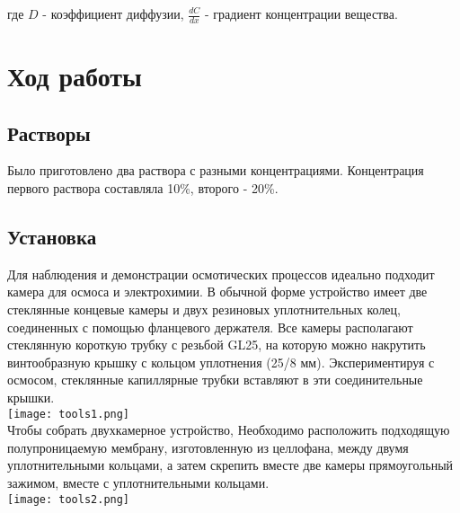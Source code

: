 \documentclass{article}
\begin{document}
            где $D$ - коэффициент диффузии, $\frac{dC}{dx}$ - градиент концентрации
            вещества. \\

    \newpage
    \section*{Ход работы}

        \subsection*{Растворы}
            \hspace*{4mm}Было приготовлено два раствора  с разными концентрациями.
            Концентрация первого раствора составляла 10\%, второго - 20\%.


        \subsection*{Установка}
            \hspace*{4mm}Для наблюдения и демонстрации осмотических процессов идеально
            подходит камера для осмоса и электрохимии. В обычной форме
            устройство имеет две стеклянные концевые камеры и двух резиновых
            уплотнительных колец, соединенных с помощью фланцевого держателя. Все
            камеры располагают стеклянную короткую трубку с резьбой GL25, на которую
            можно накрутить винтообразную крышку с кольцом уплотнения (25/8 мм).
            Экспериментируя с осмосом, стеклянные капиллярные трубки вставляют в эти
            соединительные крышки. \\
        
            \texttt{[image: tools1.png]} \\

            \hspace*{4mm}Чтобы собрать двухкамерное устройство,
            Необходимо расположить подходящую полупроницаемую мембрану,
            изготовленную из целлофана, между двумя уплотнительными кольцами, а затем
            скрепить вместе две камеры прямоугольный зажимом, вместе с
            уплотнительными кольцами. \\

            \texttt{[image: tools2.png]} \\
\end{document}
